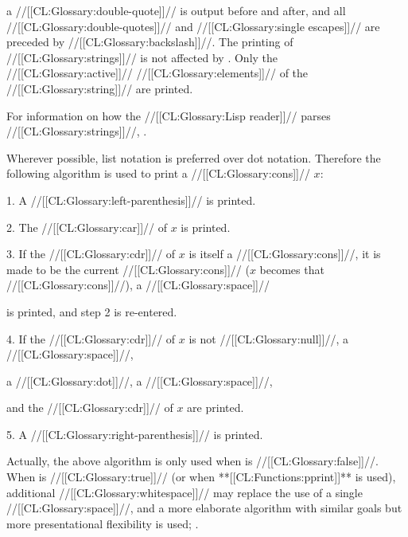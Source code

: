 a //[[CL:Glossary:double-quote]]// is output before and after, and all
//[[CL:Glossary:double-quotes]]// and //[[CL:Glossary:single escapes]]// are preceded by //[[CL:Glossary:backslash]]//.
The printing of //[[CL:Glossary:strings]]// is not affected by .
Only the //[[CL:Glossary:active]]// //[[CL:Glossary:elements]]// of the //[[CL:Glossary:string]]// are printed.

For information on how the //[[CL:Glossary:Lisp reader]]// parses //[[CL:Glossary:strings]]//,
\seesection\Doublequote.

\endsubsubsection%


Wherever possible, list notation is preferred over dot notation.  
Therefore the following algorithm is used to print a //[[CL:Glossary:cons]]// $x$:

\goodbreak
\beginlist
\item{1.} A //[[CL:Glossary:left-parenthesis]]// is printed.

\medbreak
\item{2.} The //[[CL:Glossary:car]]// of $x$ is printed. 

\medbreak
\item{3.} If the //[[CL:Glossary:cdr]]// of $x$ is itself a //[[CL:Glossary:cons]]//,
          it is made to be the current //[[CL:Glossary:cons]]// 
	  (\ie $x$ becomes that //[[CL:Glossary:cons]]//), 
	  a //[[CL:Glossary:space]]//


	  is printed,
          and step 2 is re-entered.

\medbreak
\item{4.} If the //[[CL:Glossary:cdr]]// of $x$ is not //[[CL:Glossary:null]]//, 
	  a //[[CL:Glossary:space]]//,


          a //[[CL:Glossary:dot]]//,
	  a //[[CL:Glossary:space]]//,


          and the //[[CL:Glossary:cdr]]// of $x$ are printed.

\medbreak
\item{5.} A //[[CL:Glossary:right-parenthesis]]// is printed.
\endlist

Actually, the above algorithm is only used when 
is //[[CL:Glossary:false]]//.  When  is //[[CL:Glossary:true]]// (or 
when **[[CL:Functions:pprint]]** is used),
additional //[[CL:Glossary:whitespace]]// 
may replace the use of a single //[[CL:Glossary:space]]//,
and a more elaborate algorithm with similar goals but more presentational 
flexibility is used; \seesection\PrinterDispatch.




